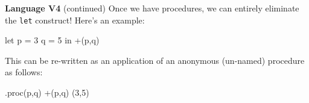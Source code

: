 \begin{minipage}[t]{\sw}
\slidenumber
\LARGE
{\bf Language V4} (continued)\exx
Once we have procedures,
we can entirely eliminate the \verb'let' construct!
Here's an example:
\Large
\begin{qv}
let
  p = 3
  q = 5
in
  +(p,q)
\end{qv}
\LARGE
This can be re-written as an application
of an anonymous (un-named) procedure as follows:
\Large
\begin{qv}
.proc(p,q) +(p,q) (3,5)
\end{qv}
\end{minipage}
